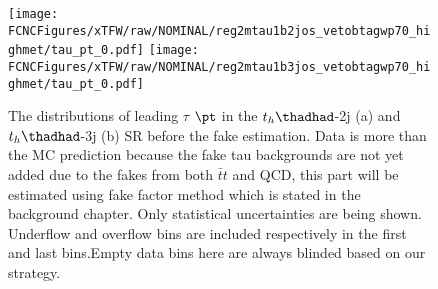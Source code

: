 \begin{figure}[H]
\centering
\texttt{[image: \\FCNCFigures/xTFW/raw/NOMINAL/reg2mtau1b2jos\_vetobtagwp70\_highmet/tau\_pt\_0.pdf]}
\texttt{[image: \\FCNCFigures/xTFW/raw/NOMINAL/reg2mtau1b3jos\_vetobtagwp70\_highmet/tau\_pt\_0.pdf]}
\caption{ The distributions of leading $\tau$ $\pt$ in the $t_h\thadhad$-2j (a) and $t_h\thadhad$-3j (b) SR before the fake estimation. Data is more than the MC prediction because the fake tau backgrounds are not yet added due to the fakes from both $\bar{t}t$ and QCD, this part will be estimated using fake factor method which is stated in the background chapter. Only
statistical uncertainties are being shown. Underflow and overflow bins are included respectively in the first and last bins.Empty data bins here are always blinded based on our strategy.}
\label{fig:intro_os_pre_hadhad}
\end{figure}

